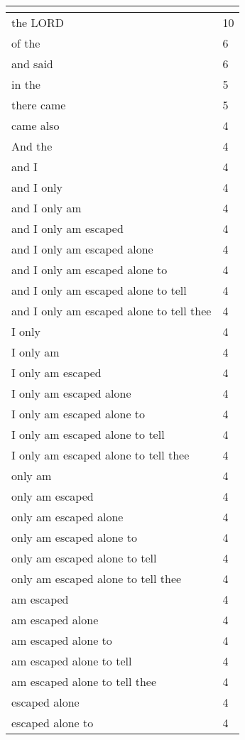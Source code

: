 \begin{center}
\begin{longtable}{|p{3.0in}|p{0.5in}|}
\hline \multicolumn{2}{c}{{ }} \\ \hline
\endfoot 
the LORD & 10\\ \hline 
of the & 6\\ \hline 
and said & 6\\ \hline 
in the & 5\\ \hline 
there came & 5\\ \hline 
came also & 4\\ \hline 
And the & 4\\ \hline 
and I & 4\\ \hline 
and I only & 4\\ \hline 
and I only am & 4\\ \hline 
and I only am escaped & 4\\ \hline 
and I only am escaped alone & 4\\ \hline 
and I only am escaped alone to & 4\\ \hline 
and I only am escaped alone to tell & 4\\ \hline 
and I only am escaped alone to tell thee & 4\\ \hline 
I only & 4\\ \hline 
I only am & 4\\ \hline 
I only am escaped & 4\\ \hline 
I only am escaped alone & 4\\ \hline 
I only am escaped alone to & 4\\ \hline 
I only am escaped alone to tell & 4\\ \hline 
I only am escaped alone to tell thee & 4\\ \hline 
only am & 4\\ \hline 
only am escaped & 4\\ \hline 
only am escaped alone & 4\\ \hline 
only am escaped alone to & 4\\ \hline 
only am escaped alone to tell & 4\\ \hline 
only am escaped alone to tell thee & 4\\ \hline 
am escaped & 4\\ \hline 
am escaped alone & 4\\ \hline 
am escaped alone to & 4\\ \hline 
am escaped alone to tell & 4\\ \hline 
am escaped alone to tell thee & 4\\ \hline 
escaped alone & 4\\ \hline 
escaped alone to & 4\\ \hline 

\end{longtable}
\end{center}
